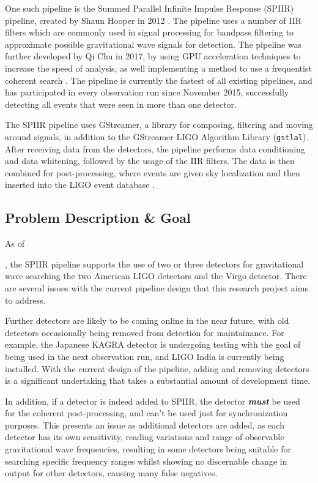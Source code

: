 \documentclass{article}
\begin{document}
One such pipeline is the Summed Parallel Infinite Impulse Response (SPIIR) pipeline, created by
Shaun Hooper in 2012 \cite{SPIIRCreate}. The pipeline uses a number of IIR filters \textendash{}
which are commonly used in signal processing for bandpass filtering \textendash{} to approximate
possible gravitational wave signals for detection. The pipeline was further developed by Qi Chu in
2017, by using GPU acceleration techniques to increase the speed of analysis, as well implementing
a method to use a frequentist coherent search \cite{ChuThesis}. The pipeline is currently the
fastest of all existing pipelines, and has participated in every observation run since November
2015, successfully detecting all events that were seen in more than one detector.

The SPIIR pipeline uses GStreamer, a library for composing, filtering and moving around signals, in
addition to the GStreamer LIGO Algorithm Library (\texttt{gstlal}). After receiving data from the
detectors, the pipeline performs data conditioning and data whitening, followed by the usage of the
IIR filters. The data is then combined for post-processing, where events are given sky localization
and then inserted into the LIGO event database \cite{SPIIRGPU2018}.

\subsection{Problem Description \& Goal}
As of \date{2020-04-20}, the SPIIR pipeline supports the use of two or three detectors for gravitational
wave searching \textendash{} the two American LIGO detectors and the Virgo detector. There are
several issues with the current pipeline design that this research project aims to address.

Further detectors are likely to be coming online in the near future, with old detectors occasionally
being removed from detection for maintainance. For example, the Japanese KAGRA detector is
undergoing testing with the goal of being used in the next observation run, and LIGO India is
currently being installed. With the current design of the pipeline, adding and removing detectors is
a significant undertaking that takes a substantial amount of development time.

In addition, if a detector is indeed added to SPIIR, the detector \textit{\textbf{must}} be used for
the coherent post-processing, and can't be used just for synchronization purposes. This presents an
issue as additional detectors are added, as each detector has its own sensitivity, reading
variations and range of observable gravitational wave frequencies, resulting in some detectors being
suitable for searching specific frequency ranges whilst showing no discernable change in output for
other detectors, causing many false negatives.
\end{document}
